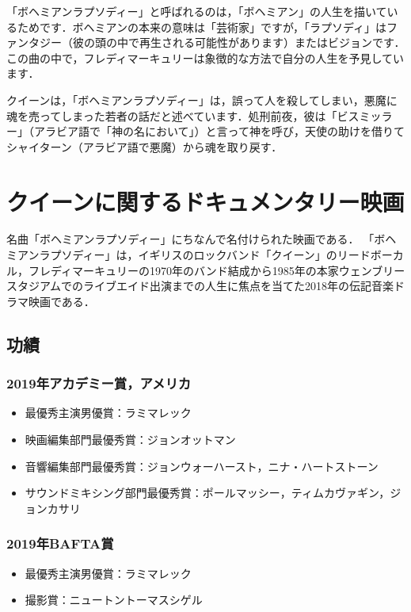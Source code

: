 \documentclass[a4j, twocolumn]{jarticle}
\begin{document}
「ボヘミアンラプソディー」と呼ばれるのは，「ボヘミアン」の人生を描いているためです．ボヘミアンの本来の意味は「芸術家」ですが，「ラプソディ」はファンタジー（彼の頭の中で再生される可能性があります）またはビジョンです． この曲の中で，フレディマーキュリーは象徴的な方法で自分の人生を予見しています．

クイーンは，「ボヘミアンラプソディー」は，誤って人を殺してしまい，悪魔に魂を売ってしまった若者の話だと述べています．処刑前夜，彼は「ビスミッラー」（アラビア語で「神の名において」）と言って神を呼び，天使の助けを借りてシャイターン（アラビア語で悪魔）から魂を取り戻す．

\section{クイーンに関するドキュメンタリー映画}
名曲「ボヘミアンラプソディー」にちなんで名付けられた映画である．
「ボヘミアンラプソディー」は，イギリスのロックバンド「クイーン」のリードボーカル，フレディマーキュリーの1970年のバンド結成から1985年の本家ウェンブリースタジアムでのライブエイド出演までの人生に焦点を当てた2018年の伝記音楽ドラマ映画である．

\vspace{-15pt}

\subsection{功績}
\subsubsection{2019年アカデミー賞，アメリカ}
\begin{itemize}
  \item 最優秀主演男優賞：ラミマレック
  \item 映画編集部門最優秀賞：ジョンオットマン
  \item 音響編集部門最優秀賞：ジョンウォーハースト，ニナ・ハートストーン
  \item サウンドミキシング部門最優秀賞：ポールマッシー，ティムカヴァギン，ジョンカサリ
\end{itemize}
\vspace{-25pt}
\subsubsection{2019年BAFTA賞}
\begin{itemize}
  \item 最優秀主演男優賞：ラミマレック
  \item 撮影賞：ニュートントーマスシゲル
\end{itemize}
\vspace{-25pt}
\end{document}
